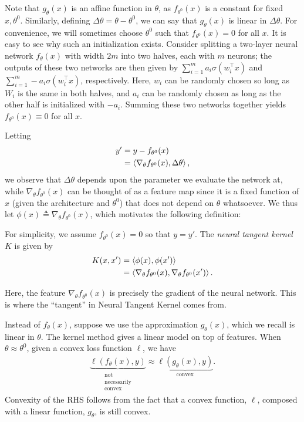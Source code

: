 Note that $g_\theta(x)$ is an affine function in $\theta$, as $f_{\theta^0}(x)$ is a constant for fixed $x,\theta^0$. Similarly, defining $\Delta \theta = \theta-\theta^0$, we can say that $g_\theta(x)$ is linear in $\Delta \theta$. For convenience, we will sometimes choose $\theta^0$ such that $f_{\theta^0}(x) = 0$ for all $x$. It is easy to see why such an initialization exists. Consider splitting a two-layer neural network $f_{\theta}(x)$ with width $2m$ into two halves, each with $m$ neurons; the outputs of these two networks are then given by $\sum_{i=1}^m a_i \sigma (w_i^\top x)$ and $\sum_{i=1}^m -a_i \sigma (w_i^\top x)$, respectively. Here, $w_i$ can be randomly chosen so long as $W_i$ is the same in both halves, and $a_i$ can be randomly chosen as long as the other half is initialized with $-a_i$. Summing these two networks together yields $f_{\theta^0}(x) \equiv 0$ for all $x$.

Letting 
\begin{align}
    y' &= y- f_{\theta^0}(x) \\
    &= \left\langle\nabla_\theta f_{\theta^0}(x), \Delta \theta\right\rangle,
\end{align}
we observe that $\Delta \theta$ depends upon the parameter we evaluate the network at, while $\nabla_\theta f_{\theta^0}(x)$ can be thought of as a feature map since it is a fixed function of $x$ (given the architecture and $\theta^0$) that does not depend on $\theta$ whatsoever. We thus let $\phi(x) \triangleq \nabla_\theta f_{\theta^0}(x)$, which motivates the following definition: 

\begin{definition}
For simplicity, we assume $f_{\theta^0}(x)=0$ so that $y=y'$. The \textit{neural tangent kernel} $K$ is given by  
\begin{align} 
    K(x,x') &= \left\langle\phi(x), \phi(x')\right\rangle \\
    &= \left\langle\nabla_\theta f_{\theta^0}(x), \nabla_\theta f_{\theta^0}(x')\right\rangle.
\end{align} 
\end{definition}
Here, the feature $\nabla_\theta f_{\theta^0}(x)$ is precisely the gradient of the neural network. This is where the ``tangent'' in Neural Tangent Kernel comes from. 

Instead of $f_\theta(x)$, suppose we use the approximation $g_\theta(x)$, which we recall is linear in $\theta$. The kernel method gives a linear model on top of features. When $\theta \approx {\theta^0}$, given a convex loss function $\ell$, we have 
\begin{align} 
    \underbrace{\ell (f_\theta(x),y)}_{\substack{\text{not} \\ \text{necessarily} \\ \text{convex}}} \approx \underbrace{\ell(g_\theta(x),y)}_{\text{convex}}.
\end{align} 
Convexity of the RHS follows from the fact that a convex function, $\ell$, composed with a linear function, $g_\theta$, is still convex. 

